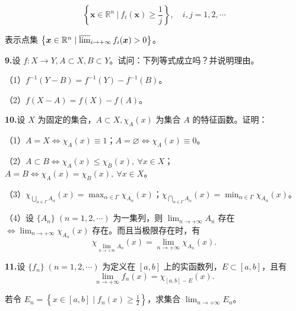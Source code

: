 \documentclass[11pt,a4paper]{article}
\begin{document}
\[\left\{\boldsymbol{x}\in\mathbb R^n\ \bigg|\ f_i(\boldsymbol{x})\geq\frac1j\right\},\quad i,j=1,2,\cdots\]
\par\noindent 表示点集 $\left\{\boldsymbol{x}\in\mathbb R^n\mid\varlimsup_{i\to+\infty}f_i(\boldsymbol{x})>0\right\}$。
\par{}\noindent\textbf{9.}\quad 设 $f:X\to Y,A\subset X,B\subset Y$。试问：下列等式成立吗？并说明理由。
\par\noindent （1）$f^{-1}(Y-B)=f^{-1}(Y)-f^{-1}(B)$。
\par\noindent （2）$f(X-A)=f(X)-f(A)$。
\par{}\noindent\textbf{10.}\quad 设 $X$ 为固定的集合，$A\subset X,\chi_A(x)$ 为集合 $A$ 的特征函数。证明：
\par\noindent （1）$A=X\Leftrightarrow\chi_A(x)\equiv1$；$A=\varnothing\Leftrightarrow\chi_A(x)\equiv0$。
\par\noindent （2）$A\subset B\Leftrightarrow\chi_A(x)\leq\chi_B(x),\ \forall x\in X$；$A=B\Leftrightarrow\chi_A(x)=\chi_B(x),\ \forall x\in X$。
\par\noindent （3）$\chi_{\bigcup_{\alpha\in\Gamma}A_\alpha}(x)=\max_{\alpha\in\Gamma}\chi_{A_\alpha}(x)$；$\chi_{\bigcap_{\alpha\in\Gamma}A_\alpha}(x)=\min_{\alpha\in\Gamma}\chi_{A_\alpha}(x)$。
\par\noindent （4）设 $\{A_n\}\;(n=1,2,\cdots)$ 为一集列，则 $\lim_{n\to+\infty}A_n$ 存在 $\Leftrightarrow\lim_{n\to+\infty}\chi_{A_n}(x)$ 存在。而且当极限存在时，有
\[\chi_{\lim_{n\to+\infty}A_n}(x)=\lim_{n\to+\infty}\chi_{A_n}(x).\]
\par{}\noindent\textbf{11.}\quad 设 $\{f_n\}\;(n=1,2,\cdots)$ 为定义在 $[a,b]$ 上的实函数列，$E\subset[a,b]$，且有
\[\lim_{n\to+\infty} f_n(x)=\chi_{[a,b]-E}(x).\]
\par\noindent 若令 $E_n=\left\{x\in[a,b]\mid f_n(x)\geq\frac12\right\}$，求集合 $\lim_{n\to+\infty}E_n$。
\end{document}
